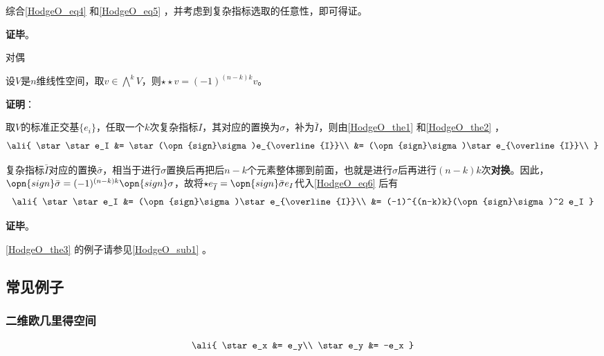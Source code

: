 综合\autoref{HodgeO_eq4} 和\autoref{HodgeO_eq5} ，并考虑到复杂指标选取的任意性，即可得证。


\textbf{证毕}。



\begin{theorem}{对偶}\label{HodgeO_the3}

设$V$是$n$维线性空间，取$v\in\bigwedge^k V$，则$\star \star v = (-1)^{(n-k)k} v$。

\end{theorem}

\textbf{证明}：

取$V$的标准正交基$\{e_i\}$，任取一个$k$次复杂指标$I$，其对应的置换为$\sigma$，补为$\bar{I}$，则由\autoref{HodgeO_the1} 和\autoref{HodgeO_the2} ，
\begin{equation}\label{HodgeO_eq6}
\ali{
    \star \star e_I &= \star(\opn{sign}\sigma)e_{\overline{I}}\\
    &= (\opn{sign}\sigma)\star e_{\overline{I}}\\
}
\end{equation}

复杂指标$\bar{I}$对应的置换$\bar{\sigma}$，相当于进行$\sigma$置换后再把后$n-k$个元素整体挪到前面，也就是进行$\sigma$后再进行$(n-k)k$次\textbf{对换}。因此，$\opn{sign}\bar{\sigma}=(-1)^{(n-k)k}\opn{sign}\sigma$，故将$\star e_{\overline{I}}=\opn{sign}\bar{\sigma}e_I$代入\autoref{HodgeO_eq6} 后有
\begin{equation}
\ali{
    \star \star e_I &= (\opn{sign}\sigma)\star e_{\overline{I}}\\
    &= (-1)^{(n-k)k}(\opn{sign}\sigma)^2 e_I
}
\end{equation}

\textbf{证毕}。

\autoref{HodgeO_the3} 的例子请参见\autoref{HodgeO_sub1} 。



\subsection{常见例子}\label{HodgeO_sub1}


\subsubsection{二维欧几里得空间}


\begin{equation}
\ali{
    \star e_x &= e_y\\
    \star e_y &= -e_x
}
\end{equation}


